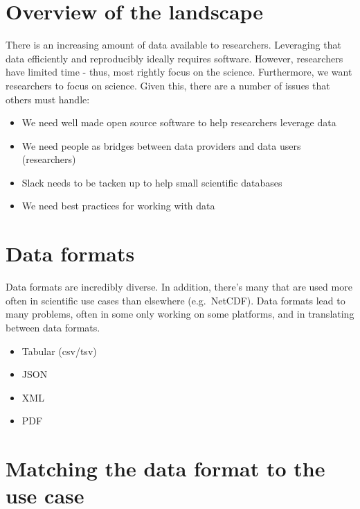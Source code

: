 \documentclass[author-year, review, 11pt]{components/elsarticle} %
\def\tightlist{}
\begin{document}
\hypertarget{overview-of-the-landscape}{%
\section{Overview of the landscape}\label{overview-of-the-landscape}}

There is an increasing amount of data available to researchers.
Leveraging that data efficiently and reproducibly ideally requires
software. However, researchers have limited time - thus, most rightly
focus on the science. Furthermore, we want researchers to focus on
science. Given this, there are a number of issues that others must
handle:

\begin{itemize}
\tightlist
\item
  We need well made open source software to help researchers leverage
  data
\item
  We need people as bridges between data providers and data users
  (researchers)
\item
  Slack needs to be tacken up to help small scientific databases
\item
  We need best practices for working with data
\end{itemize}

\hypertarget{data-formats}{%
\section{Data formats}\label{data-formats}}

Data formats are incredibly diverse. In addition, there's many that are
used more often in scientific use cases than elsewhere (e.g.~NetCDF).
Data formats lead to many problems, often in some only working on some
platforms, and in translating between data formats.

\begin{itemize}
\tightlist
\item
  Tabular (csv/tsv)
\item
  JSON
\item
  XML
\item
  PDF
\end{itemize}

\hypertarget{matching-the-data-format-to-the-use-case}{%
\section{Matching the data format to the use
case}\label{matching-the-data-format-to-the-use-case}}
\end{document}
